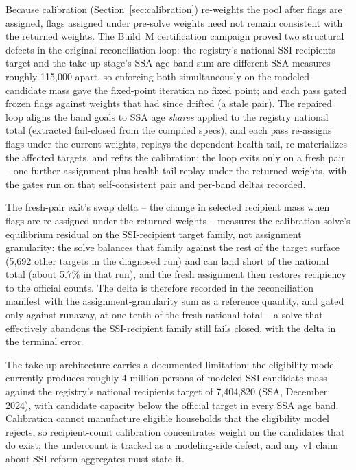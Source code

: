 Because calibration (Section~\ref{sec:calibration}) re-weights the pool
after flags are assigned, flags assigned under pre-solve weights need not
remain consistent with the returned weights. The Build~M certification
campaign proved two structural defects in the original reconciliation
loop: the registry's national SSI-recipients target and the take-up
stage's SSA age-band sum are different SSA measures roughly 115{,}000
apart, so enforcing both simultaneously on the modeled candidate mass gave
the fixed-point iteration no fixed point; and each pass gated frozen flags
against weights that had since drifted (a stale pair). The repaired loop
aligns the band goals to SSA age \emph{shares} applied to the registry
national total (extracted fail-closed from the compiled specs), and each
pass re-assigns flags under the current weights, replays the dependent
health tail, re-materializes the affected targets, and refits the
calibration; the loop exits only on a fresh pair -- one further assignment
plus health-tail replay under the returned weights, with the gates run on
that self-consistent pair and per-band deltas recorded.

The fresh-pair exit's swap delta -- the change in selected recipient mass
when flags are re-assigned under the returned weights -- measures the
calibration solve's equilibrium residual on the SSI-recipient target
family, not assignment granularity: the solve balances that family against
the rest of the target surface (5{,}692 other targets in the diagnosed
run) and can land short of the national total (about 5.7\% in that run),
and the fresh assignment then restores recipiency to the official counts.
The delta is therefore recorded in the reconciliation manifest with the
assignment-granularity sum as a reference quantity, and gated only against
runaway, at one tenth of the fresh national total -- a solve that
effectively abandons the SSI-recipient family still fails closed, with the
delta in the terminal error.

The take-up architecture carries a documented limitation: the eligibility
model currently produces roughly 4 million persons of modeled SSI
candidate mass against the registry's national recipients target of
7{,}404{,}820 (SSA, December 2024), with candidate capacity below the
official target in every SSA age band. Calibration cannot manufacture
eligible households that the eligibility model rejects, so recipient-count
calibration concentrates weight on the candidates that do exist; the
undercount is tracked as a modeling-side defect, and any v1 claim about
SSI reform aggregates must state it.

